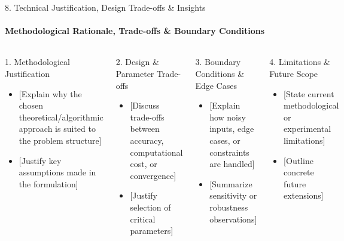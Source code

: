 \documentclass[aspectratio=169, 11pt]{beamer}
\begin{document}
\begin{frame}{8. Technical Justification, Design Trade-offs \& Insights}
    \framesubtitle{Methodological Rationale, Trade-offs \& Boundary Conditions}
    \begin{columns}[T]
        \begin{block}{1. Methodological Justification}
            \footnotesize
            \begin{itemize}
                \item {[Explain why the chosen theoretical/algorithmic approach is suited to the problem structure]}
                \item {[Justify key assumptions made in the formulation]}
            \end{itemize}
        \end{block}

        \begin{block}{2. Design \& Parameter Trade-offs}
            \footnotesize
            \begin{itemize}
                \item {[Discuss trade-offs between accuracy, computational cost, or convergence]}
                \item {[Justify selection of critical parameters]}
            \end{itemize}
        \end{block}

        \begin{block}{3. Boundary Conditions \& Edge Cases}
            \footnotesize
            \begin{itemize}
                \item {[Explain how noisy inputs, edge cases, or constraints are handled]}
                \item {[Summarize sensitivity or robustness observations]}
            \end{itemize}
        \end{block}

        \begin{block}{4. Limitations \& Future Scope}
            \footnotesize
            \begin{itemize}
                \item {[State current methodological or experimental limitations]}
                \item {[Outline concrete future extensions]}
            \end{itemize}
        \end{block}
    \end{columns}
\end{frame}
\end{document}
